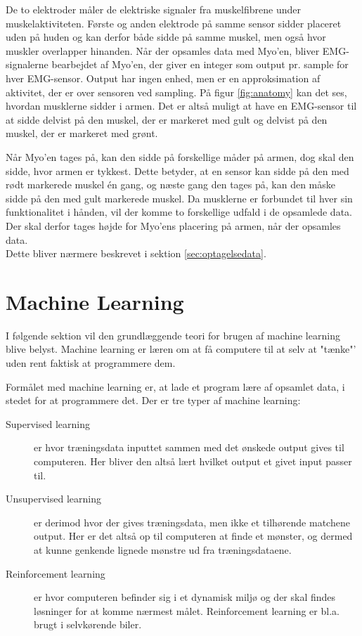 De to elektroder måler de elektriske signaler fra muskelfibrene under muskelaktiviteten\citep{RefWorks:13}. Første og anden elektrode på samme sensor sidder placeret uden på huden og kan derfor både sidde på samme muskel, men også hvor muskler overlapper hinanden. Når der opsamles data med Myo'en, bliver EMG-signalerne bearbejdet af Myo'en, der giver en integer som output pr. sample for hver EMG-sensor. Output har ingen enhed, men er en approksimation af aktivitet, der er over sensoren ved sampling. På figur \ref{fig:anatomy} kan det ses, hvordan musklerne sidder i armen. Det er altså muligt at have en EMG-sensor til at sidde delvist på den muskel, der er markeret med gult og delvist på den muskel, der er markeret med grønt.


Når Myo'en tages på, kan den sidde på forskellige måder på armen, dog skal den sidde, hvor armen er tykkest. Dette betyder, at en sensor kan sidde på den med rødt markerede muskel én gang, og næste gang den tages på, kan den måske sidde på den med gult markerede muskel. Da musklerne er forbundet til hver sin funktionalitet i hånden, vil der komme to forskellige udfald i de opsamlede data. Der skal derfor tages højde for Myo'ens placering på armen, når der opsamles data.\\
Dette bliver nærmere beskrevet i sektion \ref{sec:optagelsedata}.

\section{Machine Learning}
\label{sec:machineLearning}
I følgende sektion vil den grundlæggende teori for brugen af machine learning blive belyst. Machine learning er læren om at få computere til at selv at "tænke"' uden rent faktisk at programmere dem.

Formålet med machine learning er, at lade et program lære af opsamlet data, i stedet for at programmere det. Der er tre typer af machine learning\citep{PatternBishop}:
\begin{description}
	\item[Supervised learning] er hvor træningsdata inputtet sammen med det ønskede output gives til computeren. Her bliver den altså lært hvilket output et givet input passer til.
	\item[Unsupervised learning] er derimod hvor der gives træningsdata, men ikke et tilhørende matchene output. Her er det altså op til computeren at finde et mønster, og dermed at kunne genkende lignede mønstre ud fra træningsdataene.
	\item[Reinforcement learning] er hvor computeren befinder sig i et dynamisk miljø og der skal findes løsninger for at komme nærmest målet. Reinforcement learning er bl.a. brugt i selvkørende biler.
\end{description}

